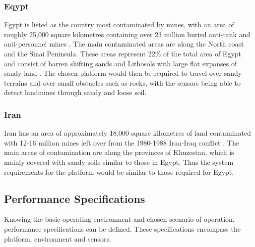 \documentclass[main.tex]{subfiles}
\begin{document}
\subsubsection{Eqypt}
Egypt is listed as the country most contaminated by mines, with an area of roughly 25,000 square kilometres containing over 23 million buried anti-tank and anti-personnel mines \parencite{Rushfan2008}. The main contaminated areas are along the North coast and the Sinai Peninsula. These areas represent 22\% of the total area of Egypt and consist of barren shifting sands and Lithosols with large flat expanses of sandy land \parencite{Nahrawy2011}. The chosen platform would then be required to travel over sandy terrains and over small obstacles such as rocks, with the sensors being able to detect landmines through sandy and loose soil. 
 \subsubsection{Iran}
Iran has an area of approximately 18,000 square kilometres of land contaminated with 12-16 million mines left over from the 1980-1988 Iran-Iraq conflict \parencite{landmineMonitor2015}. The main areas of contamination are along the provinces of Khuzestan, which is mainly covered with sandy soils similar to those in Egypt. Thus the system requirements for the platform would be similar to those required for Egypt.

\subsection{Performance Specifications}
Knowing the basic operating environment and chosen scenario of operation, performance specifications can be defined. These specifications encompass the platform, environment and sensors.
\end{document}
